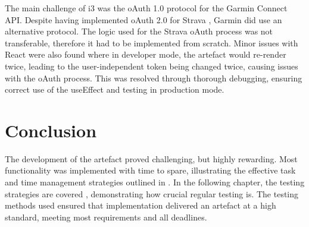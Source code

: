 The main challenge of i3 was the oAuth 1.0 protocol for the Garmin Connect API. Despite having implemented oAuth 2.0 for Strava , Garmin did use an alternative protocol. The logic used for the Strava oAuth process was not transferable, therefore it had to be implemented from scratch. Minor issues with React were also found where in developer mode, the artefact would re-render twice, leading to the user-independent token being changed twice, causing issues with the oAuth process. This was resolved through thorough debugging, ensuring correct use of the useEffect and testing in production mode.

\section{Conclusion}
\label{implementation:conclusion}

The development of the artefact proved challenging, but highly rewarding. Most functionality was implemented with time to spare, illustrating the effective task and time management strategies outlined in . In the following chapter, the testing strategies are covered , demonstrating how crucial regular testing is. The testing methods used ensured that implementation delivered an artefact at a high standard, meeting most requirements and all deadlines.